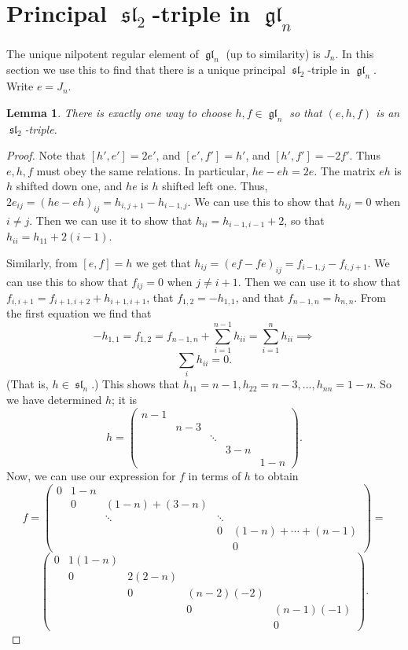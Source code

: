 \documentclass[12pt,psamsfonts]{article}
\DeclareMathOperator{\gl}{\mathfrak{gl}}
\DeclareMathOperator{\spl}{\mathfrak{sl}}
\newtheorem{lemma}[theorem]{Lemma}
\begin{document}
\section{Principal \texorpdfstring{\(\spl_2\)}{sl\_2}-triple in \texorpdfstring{\(\gl_n\)}{gl\_n}}
The unique nilpotent regular element of \(\gl_n\) (up to similarity) is \(J_n\).
In this section we use this to find that there is a unique principal \(\spl_2\)-triple in \(\gl_n\).
Write \(e = J_n\).
\begin{lemma}\label{simple_sl2_triple}
    There is exactly one way to choose \(h, f \in \gl_n\) so that \((e, h, f)\) is an \(\spl_2\)-triple.
\end{lemma}
\begin{proof}
    
Note that \([h', e'] = 2e'\), and \([e', f'] = h'\), and \([h', f'] = -2f'\).
Thus \(e, h, f\) must obey the same relations.
In particular, \(he - eh = 2e\).  
The matrix \(eh\) is \(h\) shifted down one, and \(he\) is \(h\) shifted left one.
Thus, \(2e_{ij} = (he - eh)_{ij} = h_{i, j + 1} - h_{i - 1, j}\).
We can use this to show that \(h_{ij} = 0\) when \(i \neq j\).
Then we can use it to show that \(h_{ii} = h_{i - 1, i - 1} + 2\), so that \(h_{ii} = h_{11} + 2(i - 1)\).
\par Similarly, from \([e, f] = h\) we get that \(h_{ij} = (ef - fe)_{ij} = f_{i - 1, j} - f_{i, j + 1}\).
We can use this to show that \(f_{ij} = 0\) when \(j \neq i + 1\).
Then we can use it to show that \(f_{i,i + 1} = f_{i + 1, i + 2} + h_{i + 1, i + 1}\), that \(f_{1,2} = -h_{1, 1}\), and that \(f_{n - 1, n} = h_{n,n}\).
From the first equation we find that
\[-h_{1,1} = f_{1, 2} = f_{n - 1, n} + \sum_{i = 1}^{n - 1} h_{ii} = \sum_{i = 1}^{n} h_{ii} \implies\]
\[\sum_i h_{ii} = 0.\]
(That is, \(h \in \spl_n\).)
This shows that \(h_{11} = n - 1, h_{22} = n - 3, ..., h_{nn} = 1 - n\).
So we have determined \(h\); it is 
\[h = \begin{pmatrix}
    n - 1  & \\
    & n - 3 \\
    & & \ddots \\
    & & & 3 - n \\
    & & & & 1 - n 
\end{pmatrix}.\]
Now, we can use our expression for \(f\) in terms of \(h\) to obtain
\[f = \begin{pmatrix}
    0 & 1 - n \\
    & 0 & (1 - n) + (3 - n) \\
    & & \ddots & \ddots \\
    & & & 0 & (1 - n) + \cdots + (n - 1) \\
    & & & & 0
\end{pmatrix} = \]
\[\begin{pmatrix}
    0 & 1 (1 - n) \\
      & 0 & 2 (2 - n) \\
    & & 0 & (n - 2) (-2) \\
    & & & 0 & (n - 1) (-1)\\
    & &  & & 0
\end{pmatrix}.\]
\end{proof}
\end{document}
